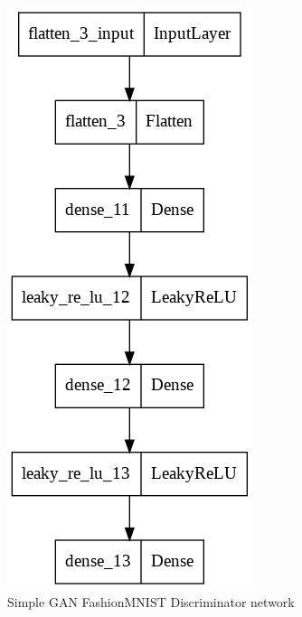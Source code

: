 \documentclass[conference]{IEEEtran}
\begin{document}
\begin{figure}[h]
\centering
\includegraphics[scale = 0.25]{dGAN_FMNIST_disc_model.png}
  \caption{Simple GAN FashionMNIST Discriminator network}
\end{figure}
\end{document}
